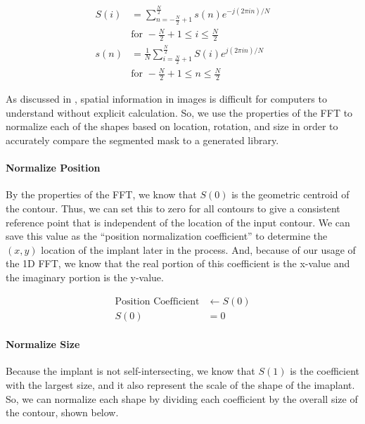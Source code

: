 \begin{equation}
    \begin{aligned}
        S(i) &= \sum_{n = -\frac{N}{2} + 1}^{\frac{N}{2}} s(n)e^{-j(2\pi i n)/N} \\
        &\text{for } -\frac{N}{2} + 1 \le i \le \frac{N}{2} \\
        s(n) &= \frac{1}{N} \sum_{i = \frac{N}{2} + 1}^{\frac{N}{2}} S(i)e^{j(2\pi i n )/N}\\
        &\text{for } -\frac{N}{2} + 1 \le n \le \frac{N}{2}
    \end{aligned}
    \label{eq:fft}
\end{equation}

As discussed in , spatial information in images is difficult for computers to understand without explicit calculation. So, we use the properties of the FFT to normalize each of the shapes based on location, rotation, and size in order to accurately compare the segmented mask to a generated library.

\paragraph*{Normalize Position}
By the properties of the FFT, we know that $S(0)$ is the geometric centroid of the contour. Thus, we can set this to zero for all contours to give a consistent reference point that is independent of the location of the input contour. We can save this value as the ``position normalization coefficient'' to determine the $(x,y)$ location of the implant later in the process. And, because of our usage of the 1D FFT, we know that the real portion of this coefficient is the x-value and the imaginary portion is the y-value.

\begin{equation}
    \begin{aligned}
        \text{Position Coefficient} &\leftarrow S(0) \\
        S(0) &= 0
    \end{aligned}
\end{equation}

\paragraph*{Normalize Size}
Because the implant is not self-intersecting, we know that $S(1)$ is the coefficient with the largest size, and it also represent the scale of the shape of the imaplant. So, we can normalize each shape by dividing each coefficient by the overall size of the contour, shown below.

